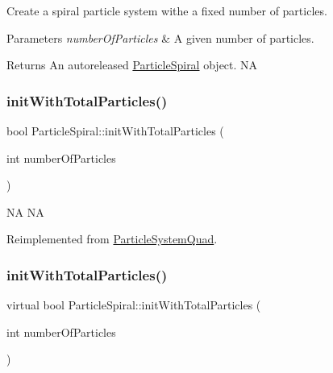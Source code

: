 Create a spiral particle system withe a fixed number of particles.


\begin{DoxyParams}{Parameters}
{\em number\+Of\+Particles} & A given number of particles. \\
\hline
\end{DoxyParams}
\begin{DoxyReturn}{Returns}
An autoreleased \hyperlink{classParticleSpiral}{Particle\+Spiral} object.  NA 
\end{DoxyReturn}
\mbox{\label{classParticleSpiral_a49dc3c1355ebb9f008ae4693bed70f58}} 
\subsubsection{\texorpdfstring{init\+With\+Total\+Particles()}{initWithTotalParticles()}\hspace{0.1cm}{\footnotesize\ttfamily [1/2]}}
{\footnotesize\ttfamily bool Particle\+Spiral\+::init\+With\+Total\+Particles (\begin{DoxyParamCaption}\item[{int}]{number\+Of\+Particles }\end{DoxyParamCaption})\hspace{0.3cm}{\ttfamily [virtual]}}

NA  NA 

Reimplemented from \hyperlink{classParticleSystemQuad_ae5420007b57e909c05e7476a54fbfbe9}{Particle\+System\+Quad}.

\mbox{\label{classParticleSpiral_a299f8e70bf5cafcbd4ff7defc8912a42}} 
\subsubsection{\texorpdfstring{init\+With\+Total\+Particles()}{initWithTotalParticles()}\hspace{0.1cm}{\footnotesize\ttfamily [2/2]}}
{\footnotesize\ttfamily virtual bool Particle\+Spiral\+::init\+With\+Total\+Particles (\begin{DoxyParamCaption}\item[{int}]{number\+Of\+Particles }\end{DoxyParamCaption})\hspace{0.3cm}{\ttfamily [virtual]}}


